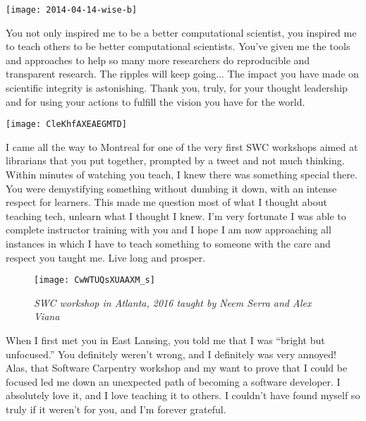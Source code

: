 \vspace*{\fill}

\newpage
\vspace*{\fill}

\begin{center}
\texttt{[image: 2014-04-14-wise-b]}
\end{center}

You not only inspired me to be a better computational scientist, you inspired
me to teach others to be better computational scientists. You've given me the
tools and approaches to help so many more researchers do reproducible and
transparent research. The ripples will keep going... The impact you have made
on scientific integrity is astonishing. Thank you, truly, for your thought
leadership and for using your actions to fulfill the vision you have for the
world. 

\vspace*{\fill}

\newpage
\begin{center}
\texttt{[image: CleKhfAXEAEGMTD]}
\end{center}

I came all the way to Montreal for one of the very first SWC workshops aimed at
librarians that you put together, prompted by a tweet and not much thinking.
Within minutes of watching you teach, I knew there was something special there.
You were demystifying something without dumbing it down, with an intense
respect for learners. This made me question most of what I thought about
teaching tech, unlearn what I thought I knew. I'm very fortunate I was able to
complete instructor training with you and I hope I am now approaching all
instances in which I have to teach something to someone with the care and
respect you taught me. Live long and prosper.


\newpage

\begin{figure}[h!]
\begin{center}
\texttt{[image: CwWTUQsXUAAXM\_s]}
\caption*{\textit{SWC workshop in Atlanta, 2016 taught by Neem Serra and Alex Viana}}
\end{center}
\end{figure}

When I first met you in East Lansing, you told me that I was ``bright but
unfocused.''  You definitely weren't wrong, and I definitely was very annoyed!
Alas, that Software Carpentry workshop and my want to prove that I could be
focused led me down an unexpected path of becoming a software developer.  I
absolutely love it, and I love teaching it to others.  I couldn't have found
myself so truly if it weren't for you, and I'm forever grateful.

